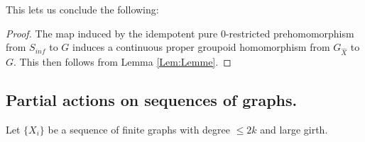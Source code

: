\begin{conjecture}
This lets us conclude the following:
\begin{proof}
The map induced by the idempotent pure 0-restricted prehomomorphism from $S_{inf}$ to $G$ induces a continuous proper groupoid homomorphism from $G_{\widehat{X}}$ to $G$. This then follows from Lemma \ref{Lem:Lemme}.\end{proof}

\subsection{Partial actions on sequences of graphs.}
Let $\lbrace X_{i} \rbrace$ be a sequence of finite graphs with degree $\leq 2k$ and large girth.


\end{conjecture}
